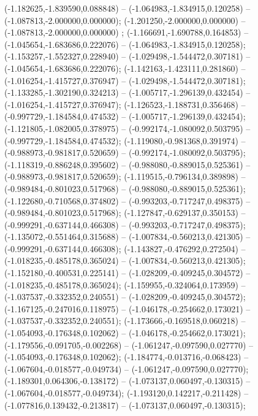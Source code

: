  (-1.182625,-1.839590,0.088848) -- (-1.064983,-1.834915,0.120258) -- (-1.087813,-2.000000,0.000000);
 (-1.201250,-2.000000,0.000000) -- (-1.087813,-2.000000,0.000000) ;
 (-1.166691,-1.690788,0.164853) -- (-1.045654,-1.683686,0.222076) -- (-1.064983,-1.834915,0.120258);
 (-1.153257,-1.552327,0.228940) -- (-1.029498,-1.544472,0.307181) -- (-1.045654,-1.683686,0.222076);
 (-1.142163,-1.423111,0.281860) -- (-1.016254,-1.415727,0.376947) -- (-1.029498,-1.544472,0.307181);
 (-1.133285,-1.302190,0.324213) -- (-1.005717,-1.296139,0.432454) -- (-1.016254,-1.415727,0.376947);
 (-1.126523,-1.188731,0.356468) -- (-0.997729,-1.184584,0.474532) -- (-1.005717,-1.296139,0.432454);
 (-1.121805,-1.082005,0.378975) -- (-0.992174,-1.080092,0.503795) -- (-0.997729,-1.184584,0.474532);
 (-1.119080,-0.981368,0.391974) -- (-0.988973,-0.981817,0.520659) -- (-0.992174,-1.080092,0.503795);
 (-1.118319,-0.886248,0.395602) -- (-0.988080,-0.889015,0.525361) -- (-0.988973,-0.981817,0.520659);
 (-1.119515,-0.796134,0.389898) -- (-0.989484,-0.801023,0.517968) -- (-0.988080,-0.889015,0.525361);
 (-1.122680,-0.710568,0.374802) -- (-0.993203,-0.717247,0.498375) -- (-0.989484,-0.801023,0.517968);
 (-1.127847,-0.629137,0.350153) -- (-0.999291,-0.637144,0.466308) -- (-0.993203,-0.717247,0.498375);
 (-1.135072,-0.551464,0.315688) -- (-1.007834,-0.560213,0.421305) -- (-0.999291,-0.637144,0.466308);
 (-1.143827,-0.476292,0.272504) -- (-1.018235,-0.485178,0.365024) -- (-1.007834,-0.560213,0.421305);
 (-1.152180,-0.400531,0.225141) -- (-1.028209,-0.409245,0.304572) -- (-1.018235,-0.485178,0.365024);
 (-1.159955,-0.324064,0.173959) -- (-1.037537,-0.332352,0.240551) -- (-1.028209,-0.409245,0.304572);
 (-1.167125,-0.247016,0.118975) -- (-1.046178,-0.254662,0.173021) -- (-1.037537,-0.332352,0.240551);
 (-1.173666,-0.169518,0.060218) -- (-1.054093,-0.176348,0.102062) -- (-1.046178,-0.254662,0.173021);
 (-1.179556,-0.091705,-0.002268) -- (-1.061247,-0.097590,0.027770) -- (-1.054093,-0.176348,0.102062);
 (-1.184774,-0.013716,-0.068423) -- (-1.067604,-0.018577,-0.049734) -- (-1.061247,-0.097590,0.027770);
 (-1.189301,0.064306,-0.138172) -- (-1.073137,0.060497,-0.130315) -- (-1.067604,-0.018577,-0.049734);
 (-1.193120,0.142217,-0.211428) -- (-1.077816,0.139432,-0.213817) -- (-1.073137,0.060497,-0.130315);
